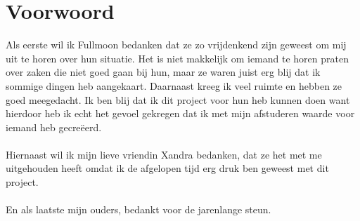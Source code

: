 \chapter*{Voorwoord} 

Als eerste wil ik Fullmoon bedanken dat ze zo vrijdenkend zijn geweest om mij uit te horen over hun situatie. Het is niet makkelijk om iemand te horen praten over zaken die niet goed gaan bij hun, maar ze waren juist erg blij dat ik sommige dingen heb aangekaart. Daarnaast kreeg ik veel ruimte en hebben ze goed meegedacht. Ik ben blij dat ik dit project voor hun heb kunnen doen want hierdoor heb ik echt het gevoel gekregen dat ik met mijn afstuderen waarde voor iemand heb gecreëerd.
\\\\
Hiernaast wil ik mijn lieve vriendin Xandra bedanken, dat ze het met me uitgehouden heeft omdat ik de afgelopen tijd erg druk ben geweest met dit project.
\\\\
En als laatste mijn ouders, bedankt voor de jarenlange steun.
